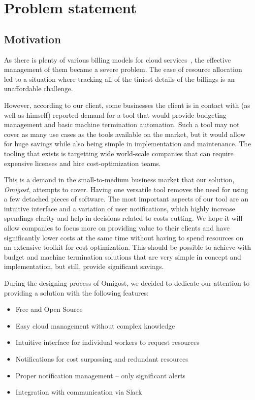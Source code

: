 \documentclass[licencjacka,en]{thesisclass}
\begin{document}
    \chapter{Problem statement}

    \section{Motivation}

    As there is plenty of various billing models for cloud services~\cite{Laatikainen},
    the effective management of them became a severe problem.
    The ease of resource allocation led to a situation where tracking all of
    the tiniest details of the billings is an unaffordable challenge.

    However, according to our client, some businesses the client is in contact with
    (as well as himself) reported demand for a tool that would provide budgeting management
    and basic machine termination automation.
    Such a tool may not cover as many use cases as the tools
    available on the market, but it would allow for huge savings while
    also being simple in implementation and maintenance.
    The tooling that exists is targetting wide world-scale companies
    that can require expensive licenses and hire cost-optimization teams.

    This is a demand in the small-to-medium business market that our solution,
    \textit{Omigost}, attempts to cover.
    Having one versatile tool removes the need for using a few detached pieces of software.
    The most important aspects of our tool are an intuitive interface and a variation
    of user notifications, which highly increase spendings clarity
    and help in decisions related to costs cutting.
    We hope it will allow companies to focus more on providing value to their clients
    and have significantly lower costs at the same time without having to spend resources
    on an extensive toolkit for cost optimization.
    This should be possible to achieve with budget and machine termination solutions
    that are very simple in concept and implementation, but still, provide significant savings.

    During the designing process of Omigost, we decided to dedicate our
    attention to providing a solution with the following features:
    \begin{itemize}
        \item Free and Open Source
        \item Easy cloud management without complex knowledge
        \item Intuitive interface for individual workers to request resources
        \item Notifications for cost surpassing and redundant resources
        \item Proper notification management -- only significant alerts
        \item Integration with communication via Slack
    \end{itemize}
\end{document}
